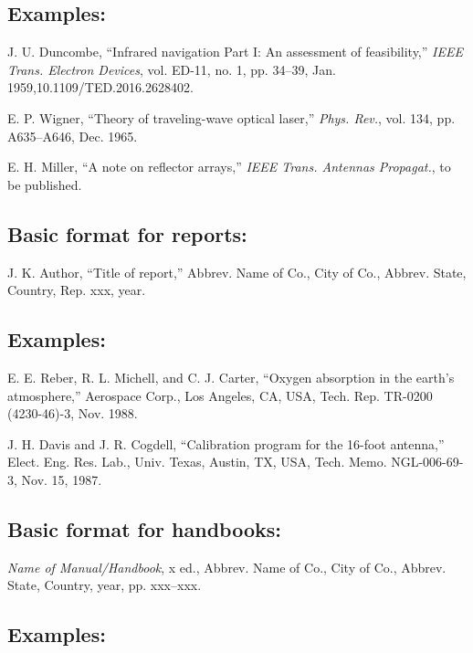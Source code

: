 \documentclass[journal]{IEEEtran}
\begin{document}
\subsection*{Examples:}

\begin{thebibliography}{34}
\setcounter{enumiv}{2}

\bibitem{}J. U. Duncombe, ``Infrared navigation Part I: An assessment of feasibility,'' {\em IEEE Trans. Electron Devices}, vol. ED-11, no. 1, pp. 34--39, Jan. 1959,10.1109/TED.2016.2628402.

\bibitem{}E. P. Wigner, ``Theory of traveling-wave optical laser,''
{\em Phys. Rev.},  vol. 134, pp. A635--A646, Dec. 1965.

\bibitem{}E. H. Miller, ``A note on reflector arrays,'' {\em IEEE Trans. Antennas Propagat.}, to be published.
\end{thebibliography}


\subsection*{Basic format for reports:}

J. K. Author, ``Title of report,'' Abbrev. Name of Co., City of Co., Abbrev. State, Country, Rep. xxx, year.

\subsection*{Examples:}
\begin{thebibliography}{34}
\setcounter{enumiv}{5}

\bibitem{} E. E. Reber, R. L. Michell, and C. J. Carter, ``Oxygen absorption in the earth’s atmosphere,'' Aerospace Corp., Los Angeles, CA, USA, Tech. Rep. TR-0200 (4230-46)-3, Nov. 1988.

\bibitem{} J. H. Davis and J. R. Cogdell, ``Calibration program for the 16-foot antenna,'' Elect. Eng. Res. Lab., Univ. Texas, Austin, TX, USA, Tech. Memo. NGL-006-69-3, Nov. 15, 1987.
\end{thebibliography}

\subsection*{Basic format for handbooks:}

{\em Name of Manual/Handbook}, x ed., Abbrev. Name of Co., City of Co., Abbrev. State, Country, year, pp. xxx--xxx.

\subsection*{Examples:}
\end{document}
